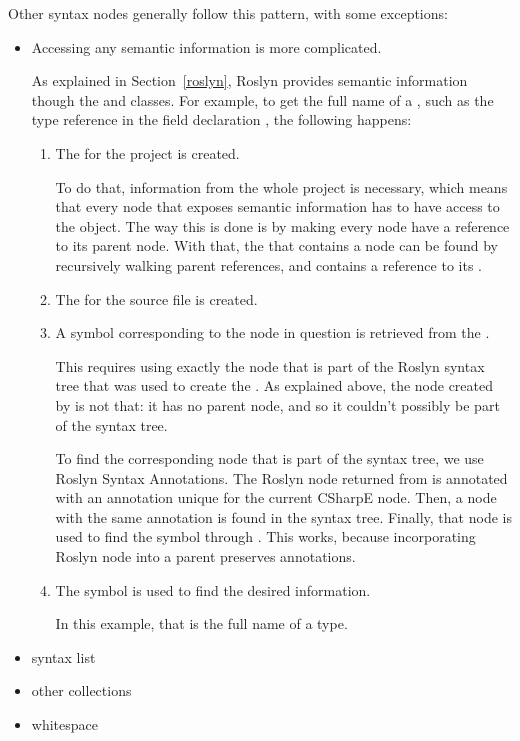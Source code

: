 Other syntax nodes generally follow this pattern, with some exceptions:

\begin{itemize}
\item Accessing any semantic information is more complicated.

As explained in Section~\ref{roslyn}, Roslyn provides semantic information though the  and  classes. For example, to get the full name of a , such as the type reference  in the field declaration , the following happens:

\begin{enumerate}
\item The  for the project is created.

To do that, information from the whole project is necessary, which means that every node that exposes semantic information has to have access to the  object. The way this is done is by making every node have a reference to its parent node. With that, the  that contains a node can be found by recursively walking parent references, and  contains a reference to its .

\item The  for the source file is created.

\item A symbol corresponding to the node in question is retrieved from the .

This requires using exactly the node that is part of the Roslyn syntax tree that was used to create the . As explained above, the node created by  is not that: it has no parent node, and so it couldn't possibly be part of the syntax tree.

To find the corresponding node that is part of the syntax tree, we use Roslyn Syntax Annotations. \cite{roslyn-annotations} The Roslyn node returned from  is annotated with an annotation unique for the current CSharpE node. Then, a node with the same annotation is found in the syntax tree. Finally, that node is used to find the symbol through . This works, because incorporating Roslyn node into a parent preserves annotations.

\item The symbol is used to find the desired information.

In this example, that is the full name of a type.

\end{enumerate}

\item syntax list
\item other collections
\item whitespace
\end{itemize}

